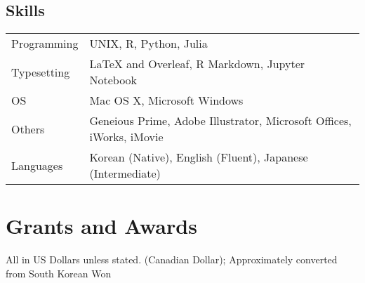 \documentclass[11pt]{article}
\begin{document}
\subsection*{Skills}
\begin{longtable}{p{}  p{}}
Programming & UNIX, R, Python, Julia\\
Typesetting &  {\LaTeX} and Overleaf, R Markdown, Jupyter Notebook\\
OS & Mac OS X, Microsoft Windows\\
Others & Geneious Prime, Adobe Illustrator, Microsoft Offices, iWorks, iMovie\\
Languages & Korean (Native), English (Fluent), Japanese (Intermediate)\vspace{5pt}\\
\end{longtable}



\hspace{0pt}


\section*{Grants and Awards}
All in US Dollars unless stated. (\dag Canadian Dollar); \ddag Approximately converted from South Korean Won 
\end{document}
